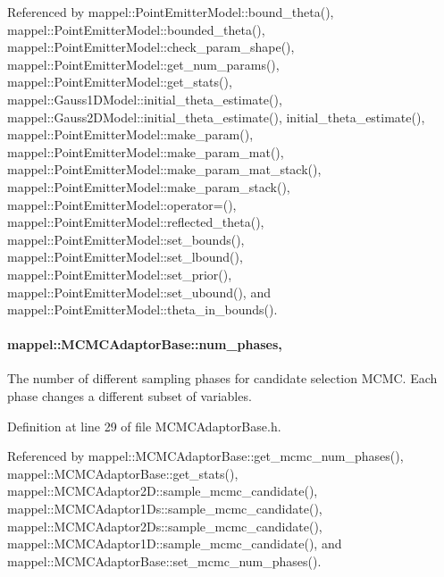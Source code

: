 Referenced by mappel\+::\+Point\+Emitter\+Model\+::bound\+\_\+theta(), mappel\+::\+Point\+Emitter\+Model\+::bounded\+\_\+theta(), mappel\+::\+Point\+Emitter\+Model\+::check\+\_\+param\+\_\+shape(), mappel\+::\+Point\+Emitter\+Model\+::get\+\_\+num\+\_\+params(), mappel\+::\+Point\+Emitter\+Model\+::get\+\_\+stats(), mappel\+::\+Gauss1\+D\+Model\+::initial\+\_\+theta\+\_\+estimate(), mappel\+::\+Gauss2\+D\+Model\+::initial\+\_\+theta\+\_\+estimate(), initial\+\_\+theta\+\_\+estimate(), mappel\+::\+Point\+Emitter\+Model\+::make\+\_\+param(), mappel\+::\+Point\+Emitter\+Model\+::make\+\_\+param\+\_\+mat(), mappel\+::\+Point\+Emitter\+Model\+::make\+\_\+param\+\_\+mat\+\_\+stack(), mappel\+::\+Point\+Emitter\+Model\+::make\+\_\+param\+\_\+stack(), mappel\+::\+Point\+Emitter\+Model\+::operator=(), mappel\+::\+Point\+Emitter\+Model\+::reflected\+\_\+theta(), mappel\+::\+Point\+Emitter\+Model\+::set\+\_\+bounds(), mappel\+::\+Point\+Emitter\+Model\+::set\+\_\+lbound(), mappel\+::\+Point\+Emitter\+Model\+::set\+\_\+prior(), mappel\+::\+Point\+Emitter\+Model\+::set\+\_\+ubound(), and mappel\+::\+Point\+Emitter\+Model\+::theta\+\_\+in\+\_\+bounds().

\paragraph[{\texorpdfstring{num\+\_\+phases}{num_phases}}]{ mappel\+::\+M\+C\+M\+C\+Adaptor\+Base\+::num\+\_\+phases\hspace{0.3cm}{\ttfamily [protected]}, {\ttfamily [inherited]}}\hypertarget{classmappel_1_1MCMCAdaptorBase_a44b90a984ace712584074dc17831fe25}{}\label{classmappel_1_1MCMCAdaptorBase_a44b90a984ace712584074dc17831fe25}
The number of different sampling phases for candidate selection M\+C\+MC. Each phase changes a different subset of variables. 

Definition at line 29 of file M\+C\+M\+C\+Adaptor\+Base.\+h.



Referenced by mappel\+::\+M\+C\+M\+C\+Adaptor\+Base\+::get\+\_\+mcmc\+\_\+num\+\_\+phases(), mappel\+::\+M\+C\+M\+C\+Adaptor\+Base\+::get\+\_\+stats(), mappel\+::\+M\+C\+M\+C\+Adaptor2\+D\+::sample\+\_\+mcmc\+\_\+candidate(), mappel\+::\+M\+C\+M\+C\+Adaptor1\+Ds\+::sample\+\_\+mcmc\+\_\+candidate(), mappel\+::\+M\+C\+M\+C\+Adaptor2\+Ds\+::sample\+\_\+mcmc\+\_\+candidate(), mappel\+::\+M\+C\+M\+C\+Adaptor1\+D\+::sample\+\_\+mcmc\+\_\+candidate(), and mappel\+::\+M\+C\+M\+C\+Adaptor\+Base\+::set\+\_\+mcmc\+\_\+num\+\_\+phases().

